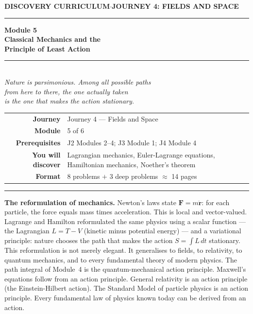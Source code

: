 \documentclass[12pt,a4paper]{article}
\newcounter{problem}
\begin{document}
\thispagestyle{empty}
\begin{center}
{\small\color{MidBlue}\textbf{DISCOVERY CURRICULUM}\quad$\cdot$\quad\textbf{JOURNEY 4: FIELDS AND SPACE}}
\vspace{0.6cm}

{\color{NavyBlue}\rule{\linewidth}{2pt}}\vspace{0.5cm}

{\Huge\bfseries\color{NavyBlue}Module 5}\\[0.3cm]
{\LARGE\bfseries\color{MidBlue}Classical Mechanics and the\\[0.2cm]Principle of Least Action}\\[0.4cm]
{\color{Gold}\rule{0.4\linewidth}{1.2pt}}\\[0.4cm]
{\large\itshape\color{DarkGrey}
Nature is parsimonious. Among all possible paths\\[0.15cm]
from here to there, the one actually taken\\[0.15cm]
is the one that makes the action stationary.}

\vspace{1cm}
\begin{tabular}{rl}
\color{DarkGrey}\textbf{Journey}           & Journey 4 --- Fields and Space \\[4pt]
\color{DarkGrey}\textbf{Module}            & 5 of 6 \\[4pt]
\color{DarkGrey}\textbf{Prerequisites}     & J2 Modules 2--4; J3 Module 1; J4 Module 4 \\[4pt]
\color{DarkGrey}\textbf{You will discover} & Lagrangian mechanics, Euler-Lagrange equations, Hamiltonian mechanics, Noether's theorem \\[4pt]
\color{DarkGrey}\textbf{Format}            & 8 problems $+$ 3 deep problems $\approx$ 14 pages \\
\end{tabular}
\vspace{1cm}

{\color{NavyBlue}\rule{\linewidth}{2pt}}
\end{center}

\vspace{0.5cm}
\noindent\textbf{The reformulation of mechanics.}
Newton's laws state $\mathbf{F}=m\ddot{\mathbf{r}}$: for each particle, the force equals mass times acceleration. This is local and vector-valued. Lagrange and Hamilton reformulated the same physics using a scalar function --- the Lagrangian $L = T - V$ (kinetic minus potential energy) --- and a variational principle: nature chooses the path that makes the action $S = \int L\,dt$ stationary. This reformulation is not merely elegant. It generalises to fields, to relativity, to quantum mechanics, and to every fundamental theory of modern physics. The path integral of Module~4 is the quantum-mechanical action principle. Maxwell's equations follow from an action principle. General relativity is an action principle (the Einstein-Hilbert action). The Standard Model of particle physics is an action principle. Every fundamental law of physics known today can be derived from an action.
\end{document}
